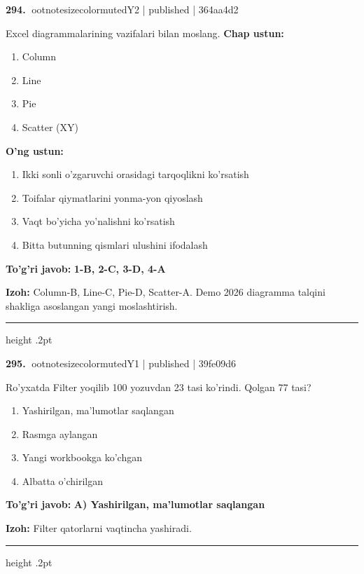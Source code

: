 \documentclass[10pt,a4paper]{article}
\begin{document}
\textbf{\color{ink}294.} {ootnotesizecolor{muted}Y2 | published | 364aa4d2}
\par
Excel diagrammalarining vazifalari bilan moslang.
\textbf{Chap ustun:}\begin{enumerate}[label=\arabic*),leftmargin=9mm]
\item Column
\item Line
\item Pie
\item Scatter (XY)
\end{enumerate}
\textbf{O'ng ustun:}\begin{enumerate}[label=\Alph*),leftmargin=9mm]
\item Ikki sonli o'zgaruvchi orasidagi tarqoqlikni ko'rsatish
\item Toifalar qiymatlarini yonma-yon qiyoslash
\item Vaqt bo'yicha yo'nalishni ko'rsatish
\item Bitta butunning qismlari ulushini ifodalash
\end{enumerate}
\begin{tcolorbox}[enhanced,breakable,colback=teal!4,colframe=teal!55!black,boxrule=0.45pt,arc=1.2mm,left=2.8mm,right=2.8mm,top=2mm,bottom=2mm]
\textbf{\color{teal}To'g'ri javob:} \textbf{1-B, 2-C, 3-D, 4-A}
\par\smallskip
\textbf{Izoh:} Column-B, Line-C, Pie-D, Scatter-A. Demo 2026 diagramma talqini shakliga asoslangan yangi moslashtirish.
\end{tcolorbox}
\vspace{2mm}\hrule height .2pt\vspace{2mm}

\textbf{\color{ink}295.} {ootnotesizecolor{muted}Y1 | published | 39fe09d6}
\par
Ro'yxatda Filter yoqilib 100 yozuvdan 23 tasi ko'rindi. Qolgan 77 tasi?
\begin{enumerate}[label=\Alph*),leftmargin=9mm]
\item Yashirilgan, ma'lumotlar saqlangan
\item Rasmga aylangan
\item Yangi workbookga ko'chgan
\item Albatta o'chirilgan
\end{enumerate}
\begin{tcolorbox}[enhanced,breakable,colback=teal!4,colframe=teal!55!black,boxrule=0.45pt,arc=1.2mm,left=2.8mm,right=2.8mm,top=2mm,bottom=2mm]
\textbf{\color{teal}To'g'ri javob:} \textbf{A) Yashirilgan, ma'lumotlar saqlangan}
\par\smallskip
\textbf{Izoh:} Filter qatorlarni vaqtincha yashiradi.
\end{tcolorbox}
\vspace{2mm}\hrule height .2pt\vspace{2mm}
\end{document}
